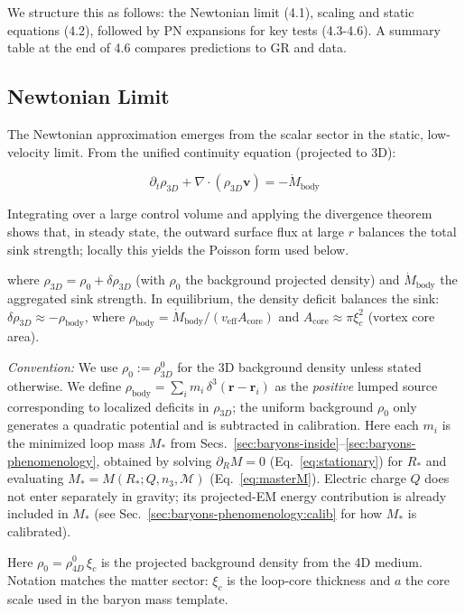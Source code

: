 We structure this as follows: the Newtonian limit (4.1), scaling and static equations (4.2), followed by PN expansions for key tests (4.3-4.6). A summary table at the end of 4.6 compares predictions to GR and data.

\subsection{Newtonian Limit}

The Newtonian approximation emerges from the scalar sector in the static, low-velocity limit. From the unified continuity equation (projected to 3D):

\[
\partial_t \rho_{3D} + \nabla \cdot (\rho_{3D} \mathbf{v}) = -\dot{M}_{\text{body}}
\]

Integrating over a large control volume and applying the divergence theorem shows that, in steady state, the outward surface flux at large $r$ balances the total sink strength; locally this yields the Poisson form used below.

where $\rho_{3D} = \rho_0 + \delta \rho_{3D}$ (with $\rho_0$ the background projected density) and $\dot{M}_{\text{body}}$ the aggregated sink strength. In equilibrium, the density deficit balances the sink: $\delta \rho_{3D} \approx -\rho_{\text{body}}$, where $\rho_{\text{body}} = \dot{M}_{\text{body}} / (v_{\text{eff}} A_{\text{core}})$ and $A_{\text{core}} \approx \pi \xi_c^2$ (vortex core area).

\noindent\textit{Convention:} We use $\rho_0 := \rho_{3D}^0$ for the 3D background density unless stated otherwise.
We define $\rho_{\text{body}} = \sum_i m_i \, \delta^3(\mathbf r - \mathbf r_i)$ as the \emph{positive} lumped source corresponding to localized deficits in $\rho_{3D}$; the uniform background $\rho_0$ only generates a quadratic potential and is subtracted in calibration.
Here each $m_i$ is the minimized loop mass $M_\ast$ from Secs.~\ref{sec:baryons-inside}--\ref{sec:baryons-phenomenology}, obtained by solving $\partial_R M=0$ (Eq.~\ref{eq:stationary}) for $R_\ast$ and evaluating $M_\ast=M(R_\ast;Q,n_3,\mathcal M)$ (Eq.~\ref{eq:masterM}). Electric charge $Q$ does not enter separately in gravity; its projected-EM energy contribution is already included in $M_\ast$ (see Sec.~\ref{sec:baryons-phenomenology:calib} for how $M_\ast$ is calibrated).

Here $\rho_0 = \rho_{4D}^0 \, \xi_c$ is the projected background density from the 4D medium. Notation matches the matter sector: $\xi_c$ is the loop-core thickness and $a$ the core scale used in the baryon mass template.

